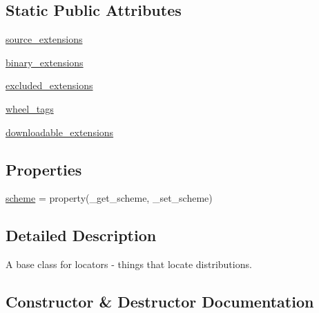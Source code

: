 \subsection*{Static Public Attributes}
\begin{DoxyCompactItemize}
\item 
\hyperlink{classpip_1_1__vendor_1_1distlib_1_1locators_1_1Locator_aac37a43f689ae35a957c9e79bf07b8c7}{source\+\_\+extensions}
\item 
\hyperlink{classpip_1_1__vendor_1_1distlib_1_1locators_1_1Locator_a820e6dc5a742ba9c37df8dc9a5e1422d}{binary\+\_\+extensions}
\item 
\hyperlink{classpip_1_1__vendor_1_1distlib_1_1locators_1_1Locator_a63e7277ab642c45ff6646cd003988220}{excluded\+\_\+extensions}
\item 
\hyperlink{classpip_1_1__vendor_1_1distlib_1_1locators_1_1Locator_ab2e03bbb86e5897acefe9dc4733d3c81}{wheel\+\_\+tags}
\item 
\hyperlink{classpip_1_1__vendor_1_1distlib_1_1locators_1_1Locator_a87a19bd2fff5970734c7c2ebace4cb28}{downloadable\+\_\+extensions}
\end{DoxyCompactItemize}
\subsection*{Properties}
\begin{DoxyCompactItemize}
\item 
\hyperlink{classpip_1_1__vendor_1_1distlib_1_1locators_1_1Locator_a3bb93cf50791a8f9a65238b3cd464fc3}{scheme} = property(\+\_\+get\+\_\+scheme, \+\_\+set\+\_\+scheme)
\end{DoxyCompactItemize}


\subsection{Detailed Description}
\begin{DoxyVerb}A base class for locators - things that locate distributions.
\end{DoxyVerb}
 

\subsection{Constructor \& Destructor Documentation}
\mbox{\label{classpip_1_1__vendor_1_1distlib_1_1locators_1_1Locator_af37665238a4ad058e6b2e4d6b77d0ffc}} 

